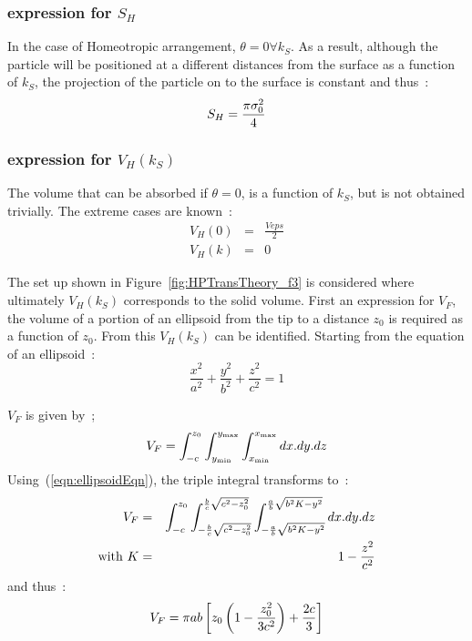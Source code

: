 \subsubsection{expression for $S_H$}

In the case of Homeotropic arrangement, $\theta=0 \forall k_S$. As a result, although the
particle will be positioned at a different distances from the surface as a function of $k_S$, the
projection of the particle on to the surface is constant and thus~:
%
\begin{equation}
        S_H = \frac{\pi\sigma_0^2}{4}
\end{equation}
%
\subsubsection{expression for $V_H(k_S)$ }

The volume that can be absorbed if $\theta=0$, is a function of $k_S$, but is not obtained
trivially. The extreme cases are known~:
\begin{eqnarray*}
        V_H(0) &=& \frac{Veps}{2}\\
	V_H(k) &=& 0
\end{eqnarray*}

The set up shown in Figure~\ref{fig:HPTransTheory_f3} is considered where ultimately 
$V_H(k_S)$ corresponds to the solid volume. First an expression for $V_F$, the volume of 
a portion of an ellipsoid from the tip to a distance $z_0$ is  required as a function 
of $z_0$. From this $V_H(k_S)$ can be identified. Starting from the equation of an ellipsoid~:
\begin{equation}
	\frac{x^2}{a^2} + \frac{y^2}{b^2} + \frac{z^2}{c^2} = 1
	\label{eqn:ellipsoidEqn}
\end{equation}

$V_F$ is given by~;
\begin{equation}
	V_F = \int^{z_0}_{-c} \int^{y_{\mathrm{max}}}_{y_{\mathrm{min}}} \int^{x_{\mathrm{max}}}_{x_{\mathrm{min}}} dx.dy.dz
\end{equation}
%
Using~(\ref{eqn:ellipsoidEqn}), the triple integral transforms to~:
%
\begin{eqnarray}
	V_F &=& \int^{z_0}_{-c}
		\int^{ \frac{b}{c}\sqrt{c^2 - z_0^2} }_{-\frac{b}{c}\sqrt{c^2 - z_0^2}}
		\int^{\frac{a}{b}\sqrt{b^2K - y^2} }_{-\frac{a}{b}\sqrt{b^2K - y^2}}
		dx.dy.dz\\
	\mathrm{with\ } K &=& 1 - \frac{z^2}{c^2} \nonumber
\end{eqnarray}
%
%
and thus~:
%
\begin{equation}
	V_F 	= \pi ab \left[  z_0\left( 1 - \frac{z_0^2}{3c^2}\right) + \frac{2c}{3} \right]
	\label{eqn:V_F(z_0)}
\end{equation}


